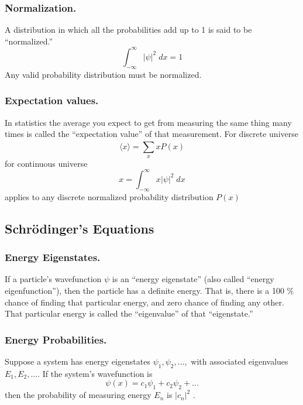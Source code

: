 \documentclass[../../main.tex]{subfiles}
\begin{document}
\subsubsection{Normalization.} A distribution in which all the probabilities add up to 1 is said to be “normalized.” 
\begin{equation*}
    \int_{-\infty}^{\infty}|\psi|^2\;dx=1
\end{equation*}
Any valid probability distribution must be normalized.

\subsubsection{Expectation values.} In statistics the average you expect to get from measuring the same thing many times is called the “expectation value” of that measurement. For discrete universe
\begin{equation*}
    \langle x\rangle=\sum_{x}^{}xP(x)
\end{equation*}
for continuous universe
\begin{equation*}
    x=\int_{-\infty}^{\infty}x|\psi|^2\;dx
\end{equation*}
applies to any discrete normalized probability distribution $P(x)$

\subsection{Schrödinger's Equations }
\subsubsection{Energy Eigenstates.} If a particle's wavefunction $\psi$ is an “energy eigenstate” (also called “energy eigenfunction”), then the particle has a definite energy. That is, there is a 100 $\%$ chance of finding that particular energy, and zero chance of finding any other. That particular energy is called the “eigenvalue” of that “eigenstate.”

\subsubsection{Energy Probabilities.} Suppose a system has energy eigenstates $\psi_1 , \psi_2,\dots , $ with associated eigenvalues $E_1 ,E_2, \dots$. If the system's wavefunction is
\begin{equation*}
 \psi(x)=c_1\psi_1+c_2\psi_2+\dots
\end{equation*}
then the probability of measuring energy $E_n$ is $|c_n|^2$ .
\end{document}
